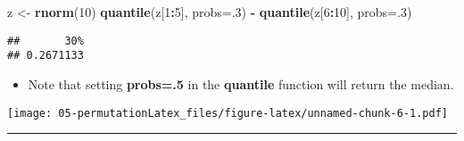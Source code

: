 \documentclass[]{book}
\newenvironment{Shaded}{\begin{snugshade}}{\end{snugshade}}
\newcommand{\DataTypeTok}[1]{\textcolor[rgb]{0.13,0.29,0.53}{#1}}
\newcommand{\DecValTok}[1]{\textcolor[rgb]{0.00,0.00,0.81}{#1}}
\newcommand{\KeywordTok}[1]{\textcolor[rgb]{0.13,0.29,0.53}{\textbf{#1}}}
\newcommand{\NormalTok}[1]{#1}
\newcommand{\OperatorTok}[1]{\textcolor[rgb]{0.81,0.36,0.00}{\textbf{#1}}}
\newcommand{\StringTok}[1]{\textcolor[rgb]{0.31,0.60,0.02}{#1}}
\providecommand{\tightlist}{%
  \setlength{\itemsep}{0pt}\setlength{\parskip}{0pt}}
\begin{document}
\begin{Shaded}
\begin{Highlighting}[]
\NormalTok{z <-}\StringTok{ }\KeywordTok{rnorm}\NormalTok{(}\DecValTok{10}\NormalTok{)}
\KeywordTok{quantile}\NormalTok{(z[}\DecValTok{1}\OperatorTok{:}\DecValTok{5}\NormalTok{], }\DataTypeTok{probs=}\NormalTok{.}\DecValTok{3}\NormalTok{) }\OperatorTok{-}\StringTok{ }\KeywordTok{quantile}\NormalTok{(z[}\DecValTok{6}\OperatorTok{:}\DecValTok{10}\NormalTok{], }\DataTypeTok{probs=}\NormalTok{.}\DecValTok{3}\NormalTok{)}
\end{Highlighting}
\end{Shaded}

\begin{verbatim}
##       30% 
## 0.2671133
\end{verbatim}

\begin{itemize}
\tightlist
\item
  Note that setting \textbf{probs=.5} in the \textbf{quantile} function will return the median.
\end{itemize}

\texttt{[image: 05-permutationLatex\_files/figure-latex/unnamed-chunk-6-1.pdf]}

\begin{center}\rule{0.5\linewidth}{\linethickness}\end{center}
\end{document}

